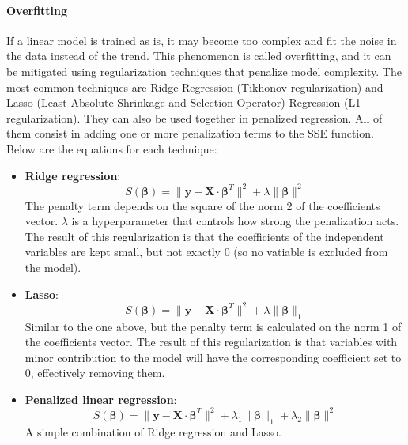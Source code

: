 \paragraph{Overfitting}
If a linear model is trained as is, it may become too complex and fit the noise in the data instead of the trend. This phenomenon is called overfitting, and it can be mitigated using regularization techniques that penalize model complexity. The most common techniques are Ridge Regression (Tikhonov regularization) and Lasso (Least Absolute Shrinkage and Selection Operator) Regression (L1 regularization). They can also be used together in penalized regression. All of them consist in adding one or more penalization terms to the SSE function. Below are the equations for each technique:
\begin{itemize}
    \item \textbf{Ridge regression}:
    \begin{equation*}
        S(\boldsymbol{\beta}) = \| \mathbf{y} - \mathbf{X} \cdot \boldsymbol{\beta}^T \|^2 + \lambda \| \boldsymbol{\beta} \|^2
    \end{equation*}
    The penalty term depends on the square of the norm 2 of the coefficients vector. $\lambda$ is a hyperparameter that controls how strong the penalization acts. The result of this regularization is that the coefficients of the independent variables are kept small, but not exactly 0 (so no vatiable is excluded from the model).
    \item \textbf{Lasso}:
    \begin{equation*}
        S(\boldsymbol{\beta}) = \| \mathbf{y} - \mathbf{X} \cdot \boldsymbol{\beta}^T \|^2 + \lambda \| \boldsymbol{\beta} \|_1
    \end{equation*}
    Similar to the one above, but the penalty term is calculated on the norm 1 of the coefficients vector. The result of this regularization is that variables with minor contribution to the model will have the corresponding coefficient set to 0, effectively removing them.
    \item \textbf{Penalized linear regression}:
    \begin{equation*}
        S(\boldsymbol{\beta}) = \| \mathbf{y} - \mathbf{X} \cdot \boldsymbol{\beta}^T \|^2 + \lambda_1 \| \boldsymbol{\beta} \|_1 + \lambda_2 \| \boldsymbol{\beta} \|^2 
    \end{equation*}
    A simple combination of Ridge regression and Lasso.
\end{itemize}


